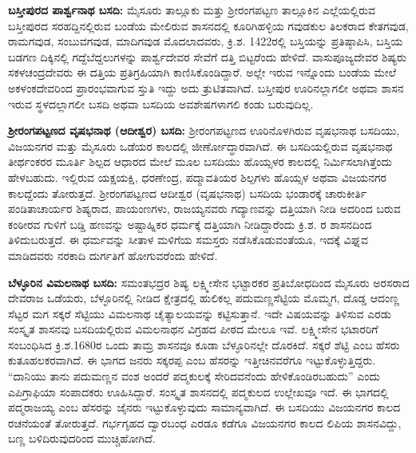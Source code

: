 \textbf{ಬಸ್ತೀಪುರದ ಪಾರ್ಶ್ವನಾಥ ಬಸದಿ:} ಮೈಸೂರು ತಾಲ್ಲೂಕು ಮತ್ತು ಶ‍್ರೀರಂಗಪಟ್ಟಣ ತಾಲ್ಲೂಕಿನ ಎಲ್ಲೆಯಲ್ಲಿರುವ ಬಸ್ತೀಪುರದ ಸರಹದ್ದಿನಲ್ಲಿರುವ ಬಂಡೆಯ ಮೇಲಿರುವ ಶಾಸನದಲ್ಲಿ ಕೂರಿಗಿಹಳ್ಳಿಯ ಗವುಡಕುಲ ತಿಲಕರಾದ ಕೇತಗವುಡ, ರಾಮಗವುಡ, ಸಂಬುವಗವುಡ, ಮಾದಿಗವುಡ ಮೊದಲಾದವರು, ಕ್ರಿ.ಶ. 1422ರಲ್ಲಿ ಬಸ್ತಿಯನ್ನು ಪ್ರತಿಷ್ಠಾಪಿಸಿ, ಬಸ್ತಿಯ ಬಡಗಣ ದಿಕ್ಕಿನಲ್ಲಿ ಗದ್ದೆಬೆದ್ದಲುಗಳನ್ನು ಪಾರ್ಶ್ವದೇವರ ಸೇವೆಗೆ ದತ್ತಿ ಬಿಟ್ಟರೆಂದು ಹೇಳಿದೆ. ವಾಸುಪೂಜ್ಯದೇವರ ಶಿಷ್ಯರು ಸಕಳಚಂದ್ರದೇವರು ಈ ದತ್ತಿಯ ಪ್ರತಿಗ್ರಹಿಯಾಗಿ ಕಾಣಿಸಿಕೊಂಡಿ\-ದ್ದಾರೆ. ಅಲ್ಲೇ ಇರುವ ಇನ್ನೊಂದು ಬಂಡೆಯ ಮೇಲೆ ಅಕಳಂಕದೇವರಿಂದ ಪ್ರಾರಂಭವಾಗುವ ಸ್ತುತಿ ಇದ್ದು ಅದು ತ್ರುಟಿತವಾಗಿದೆ. ಬಸ್ತೀಪುರ ಊರಿನಲ್ಲಾಗಲೀ ಅಥವಾ ಶಾಸನ ಇರುವ ಸ್ಥಳದಲ್ಲಾಗಲೀ ಬಸದಿ ಅಥವಾ ಬಸದಿಯ ಅವಶೇಷಗಳಾಗಲಿ ಕಂಡು ಬರುವುದಿಲ್ಲ.

\textbf{ಶ‍್ರೀರಂಗಪಟ್ಟಣದ ವೃಷಭನಾಥ (ಆದೀಶ್ವರ) ಬಸದಿ:} ಶ‍್ರೀರಂಗಪಟ್ಟಣದ ಊರಿನೊಳಗಿರುವ ವೃಷಭನಾಥ ಬಸದಿಯು, ವಿಜಯನಗರ ಮತ್ತು ಮೈಸೂರು ಒಡೆಯರ ಕಾಲದಲ್ಲಿ ಜೀರ್ಣೋದ್ಧಾರವಾಗಿದೆ. ಈ ಬಸದಿಯಲ್ಲಿರುವ ವೃಷಭನಾಥ ತೀರ್ಥಂಕರರ ಮೂರ್ತಿ ಶಿಲ್ಪದ ಆಧಾರದ ಮೇಲೆ ಮೂಲ ಬಸದಿಯು ಹೊಯ್ಸಳರ ಕಾಲದಲ್ಲಿ ನಿರ್ಮಿಸಲಾಗಿತ್ತೆಂದು ಹೇಳಬಹುದು. ಇಲ್ಲಿರುವ ಯಕ್ಷಯಕ್ಷಿ, ಧರಣೇಂದ್ರ, ಪದ್ಮಾವತಿಯರ ಶಿಲ್ಪಗಳು ಹೊಯ್ಸಳ ಅಥವಾ ವಿಜಯನಗರ ಕಾಲದ್ದೆಂದು ತೋರುತ್ತದೆ. ಶ‍್ರೀರಂಗಪಟ್ಟಣದ ಆದೀಶ್ವರ (ವೃಷಭನಾಥ) ಬಸದಿಯ ಭಂಡಾರಕ್ಕೆ ಚಾರುಕೀರ್ತಿ ಪಂಡಿತಾ\-ಚಾರ್ಯರ ಶಿಷ್ಯರಾದ, ಪಾಯಂಣಗಳು, ರಾಜಯ್ಯನವರು  ಗದ್ಯಾಣವನ್ನು ದತ್ತಿಯಾಗಿ ನೀಡಿ ಅದರಿಂದ ಬರುವ ಕಂಠೀರವ ಗುಳಿಗೆ  ಬಡ್ಡಿ ಹಣವನ್ನು ಅಷ್ಟಾಹ್ನಿಕರ ಧರ್ಮಕ್ಕೆ ದತ್ತಿಯಾಗಿ ನೀಡಿದ್ದಾರೆಂದು ಕ್ರಿ.ಶ. ರ ಶಾಸನದಿಂದ ತಿಳಿದುಬರುತ್ತದೆ. ಈ ಧರ್ಮವನ್ನು ಸೀತಾಳ ಮಳಿಗೆಯ ಸಮಸ್ತರು ನಡೆಸಿಕೊಡುವಂತೆಯೂ, ಇದಕ್ಕೆ ವಿಘ್ನವ ಮಾಡಿದವರು ನರಕಾದಿ ದುರ್ಗತಿಗೆ ಹೋಗುವರೆಂದು ಹೇಳಿದೆ.

\textbf{ಬೆಳ್ಳೂರಿನ ವಿಮಲನಾಥ ಬಸದಿ:} ಸಮಂತಭದ್ರರ ಶಿಷ್ಯ ಲಕ್ಷ್ಮೀಸೇನ ಭಟ್ಟಾರಕರ ಪ್ರತಿಬೋಧದಿಂದ ಮೈಸೂರು ಅರಸರಾದ ದೇವರಾಜ ಒಡೆಯರು, ಬೆಳ್ಳೂರಿನಲ್ಲಿ ನೀಡಿದ ಕ್ಷೇತ್ರದಲ್ಲಿ ಹುಲಿಕಲ್ಲ ಪದುಮಣ್ಣಸೆಟ್ಟಿಯ ಮೊಮ್ಮಗ, ದೊಡ್ಡ ಆದಂಣ್ಣ ಸೆಟ್ಟರ ಮಗ ಸಕ್ಕರೆ ಸೆಟ್ಟಿಯು ವಿಮಲನಾಥ ಚೈತ್ಯಾಲಯವನ್ನು ಕಟ್ಟಿಸುತ್ತಾನೆ. ಇದೇ ವಿಷಯವನ್ನು ತಿಳಿಸುವ ಎರಡು ಸಂಸ್ಕೃತ ಶಾಸನವು ಬಸದಿಯಲ್ಲಿರುವ ವಿಮಲನಾಥನ ವಿಗ್ರಹದ ಪೀಠದ ಮೇಲೂ ಇವೆ. ಲಕ್ಷ್ಮೀಸೇನ ಭಟಾರರಿಗೆ ಸಂಬಂಧಿಸಿದ ಕ್ರಿ.ಶ.1680ರ ಒಂದು ತಾಮ್ರ ಶಾಸನವೂ ಕೂಡಾ ಬೆಳ್ಳೂರಿನಲ್ಲೇ ದೊರಕಿದೆ. ಸಕ್ಕರೆ ಶೆಟ್ಟಿ ಎಂಬ ಹೆಸರು ಕುತೂಹಲಕರವಾಗಿದೆ. ಈ ಭಾಗದ ಜನರು ಸಕ್ಕರಪ್ಪ ಎಂಬ ಹೆಸರನ್ನು ಇತ್ತೀಚಿನವರೆಗೂ ಇಟ್ಟುಕೊಳ್ಳುತ್ತಿದ್ದರು. “ದಾನಿಯು ತಾನು ಪದುಮಣ್ಣನ ವಂಶ ಅಂದರೆ ಪದ್ಮಕುಲಕ್ಕೆ ಸೇರಿದವನೆಂದು ಹೇಳಿಕೊಂಡಿರಬಹುದು” ಎಂದು ಎಪಿಗ್ರಾಫಿಯಾ ಸಂಪಾದಕರು ಊಹಿಸಿದ್ದಾರೆ. ಸಂಸ್ಕೃತ ಶಾಸನದಲ್ಲಿ ಪದ್ಮಕುಲದ ಉಲ್ಲೇಖವೂ ಇದೆ. ಈ ಭಾಗದಲ್ಲಿ ಪದ್ಮರಾಜಯ್ಯ ಎಂಬ ಹೆಸರನ್ನು ಜೈನರು ಇಟ್ಟುಕೊಳ್ಳುವುದು ಸಾಮಾನ್ಯವಾಗಿದೆ. ಈ ಬಸದಿಯು ವಿಜಯನಗರ ಕಾಲದ ರಚನೆಯಂತೆ ತೋರುತ್ತದೆ. ಗರ್ಭಗೃಹದ ದ್ವಾರಬಂಧ ಎರಡೂ ಕಡೆಗೂ ವಿಜಯನಗರ ಕಾಲದ ಲಿಪಿಯ ಶಾಸನವಿದ್ದು, ಬಣ್ಣ ಬಳಿದಿರುವುದರಿಂದ ಮುಚ್ಚಿಹೋಗಿದೆ.

